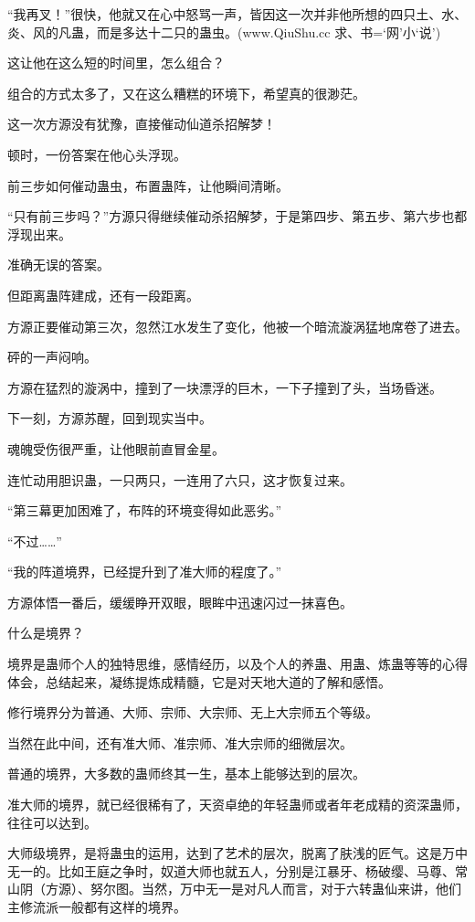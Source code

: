 \begin{this_body}
“我再叉！”很快，他就又在心中怒骂一声，皆因这一次并非他所想的四只土、水、炎、风的凡蛊，而是多达十二只的蛊虫。(www.QiuShu.cc 求、书=‘网’小‘说’)

这让他在这么短的时间里，怎么组合？

组合的方式太多了，又在这么糟糕的环境下，希望真的很渺茫。

这一次方源没有犹豫，直接催动仙道杀招解梦！

顿时，一份答案在他心头浮现。

前三步如何催动蛊虫，布置蛊阵，让他瞬间清晰。

“只有前三步吗？”方源只得继续催动杀招解梦，于是第四步、第五步、第六步也都浮现出来。

准确无误的答案。

但距离蛊阵建成，还有一段距离。

方源正要催动第三次，忽然江水发生了变化，他被一个暗流漩涡猛地席卷了进去。

砰的一声闷响。

方源在猛烈的漩涡中，撞到了一块漂浮的巨木，一下子撞到了头，当场昏迷。

下一刻，方源苏醒，回到现实当中。

魂魄受伤很严重，让他眼前直冒金星。

连忙动用胆识蛊，一只两只，一连用了六只，这才恢复过来。

“第三幕更加困难了，布阵的环境变得如此恶劣。”

“不过……”

“我的阵道境界，已经提升到了准大师的程度了。”

方源体悟一番后，缓缓睁开双眼，眼眸中迅速闪过一抹喜色。

什么是境界？

境界是蛊师个人的独特思维，感情经历，以及个人的养蛊、用蛊、炼蛊等等的心得体会，总结起来，凝练提炼成精髓，它是对天地大道的了解和感悟。

修行境界分为普通、大师、宗师、大宗师、无上大宗师五个等级。

当然在此中间，还有准大师、准宗师、准大宗师的细微层次。

普通的境界，大多数的蛊师终其一生，基本上能够达到的层次。

准大师的境界，就已经很稀有了，天资卓绝的年轻蛊师或者年老成精的资深蛊师，往往可以达到。

大师级境界，是将蛊虫的运用，达到了艺术的层次，脱离了肤浅的匠气。这是万中无一的。比如王庭之争时，奴道大师也就五人，分别是江暴牙、杨破缨、马尊、常山阴（方源）、努尔图。当然，万中无一是对凡人而言，对于六转蛊仙来讲，他们主修流派一般都有这样的境界。


\end{this_body}
